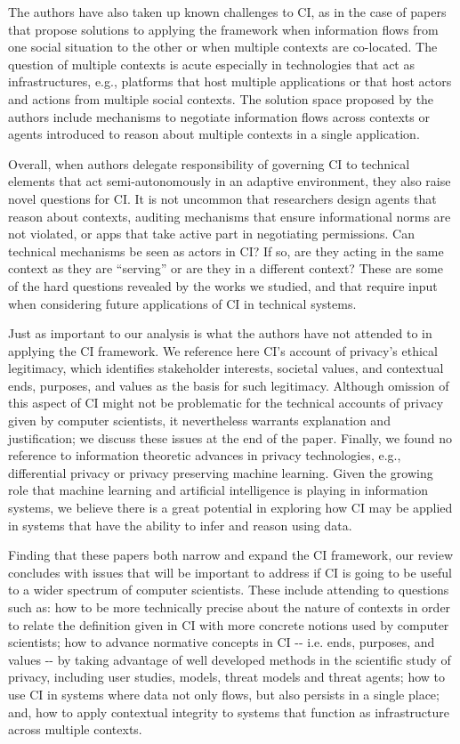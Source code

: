 \documentclass[../thesis.tex]{subfiles}
\begin{document}
The authors have also taken up known challenges to CI, as in the case of
papers that propose solutions to applying the framework when
information flows from one social situation to the other or when
multiple contexts are co-located. The question of multiple contexts is
acute especially in technologies that act as infrastructures, e.g.,
platforms that host multiple applications or that host actors and
actions from multiple social contexts. The solution space proposed by
the authors include mechanisms to negotiate information flows across
contexts or agents introduced to reason about multiple contexts in a
single application.

Overall, when authors delegate responsibility of governing CI to
technical elements that act semi-autonomously in an adaptive
environment, they also raise novel questions for CI. It is not uncommon
that researchers design agents that reason about contexts, auditing
mechanisms that ensure informational norms are not violated, or apps
that take active part in negotiating permissions. Can technical
mechanisms be seen as actors in CI? If so, are they acting in the same
context as they are ``serving'' or
are they in a different context? These are some of the hard questions
revealed by the works we studied, and that require input when
considering future applications of CI in technical systems.

Just as important to our analysis is what the authors have not attended
to in applying the CI framework. We reference here CI's
account of privacy's ethical legitimacy, which
identifies stakeholder interests, societal values, and contextual ends,
purposes, and values as the basis for such legitimacy. Although
omission of this aspect of CI might not be problematic for the
technical accounts of privacy given by computer scientists, it
nevertheless warrants explanation and justification; we discuss these
issues at the end of the paper. Finally, we found no reference to
information theoretic advances in privacy technologies, e.g.,
differential privacy or privacy preserving machine learning. Given the
growing role that machine learning and artificial intelligence is
playing in information systems, we believe there is a great potential
in exploring how CI may be applied in systems that have the ability to
infer and reason using data.

Finding that these papers both narrow and expand the CI framework, our
review concludes with issues that will be important to address if CI is
going to be useful to a wider spectrum of computer scientists. These
include attending to questions such as: how to be more technically
precise about the nature of contexts in order to relate the definition
given in CI with more concrete notions used by computer scientists; how
to advance normative concepts in CI -{}- i.e. ends, purposes, and
values -{}- by taking advantage of well developed methods in the
scientific study of privacy, including user studies, models, threat
models and threat agents; how to use CI in systems where data not only
flows, but also persists in a single place; and, how to apply
contextual integrity to systems that function as infrastructure across
multiple contexts. 
\end{document}
